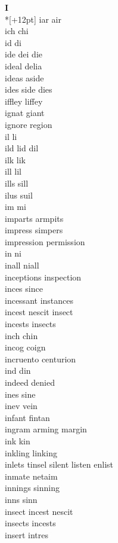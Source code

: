 \vspace{14pt}
\noindent\textbf{\Large I}\\*[+12pt]
iar air\\
ich chi\\
id di\\
ide dei die\\
ideal delia\\
ideas aside\\
ides side dies\\
iffley liffey\\
ignat giant\\
ignore region\\
il li\\
ild lid dil\\
ilk lik\\
ill lil\\
ills sill\\
ilus suil\\
im mi\\
imparts armpits\\
impress simpers\\
impression permission\\
in ni\\
inall niall\\
inceptions inspection\\
inces since\\
incessant instances\\
incest nescit insect\\
incests insects\\
inch chin\\
incog coign\\
incruento centurion\\
ind din\\
indeed denied\\
ines sine\\
inev vein\\
infant fintan\\
ingram arming margin\\
ink kin\\
inkling linking\\
inlets tinsel silent listen enlist\\
inmate netaim\\
innings sinning\\
inns sinn\\
insect incest nescit\\
insects incests\\
insert intres\\
